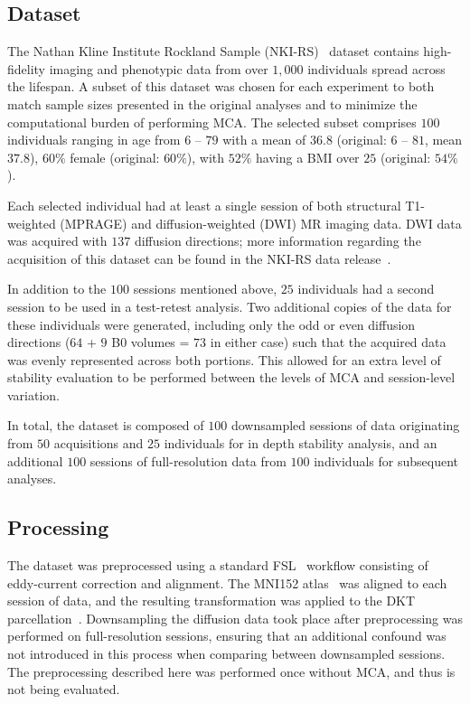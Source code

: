 \documentclass[fleqn,10pt]{SelfArx} %
\newcommand{\new}[1]{{\color{blue} #1}}
\begin{document}
\subsection*{Dataset}
The Nathan Kline Institute Rockland Sample (NKI-RS)~\cite{Nooner2012-eg} dataset contains high-fidelity imaging and
phenotypic data from over $1,000$ individuals spread across the lifespan. A subset of this dataset was chosen for each
experiment to both match sample sizes presented in the original analyses and to minimize the computational burden of
performing MCA. The selected subset comprises $100$ individuals ranging in age from $6$ – $79$ with a mean of $36.8$
(original: $6$ – $81$, mean $37.8$), $60\%$ female (original: $60\%$), with $52\%$ having a BMI over $25$ (original:
$54\%$).

Each selected individual had at least a single session of both structural T1-weighted (MPRAGE) and diffusion-weighted
(DWI) MR imaging data. DWI data was acquired with $137$ diffusion directions; more information regarding the
acquisition of this dataset can be found in the NKI-RS data release~\cite{Nooner2012-eg}.

In addition to the $100$ sessions mentioned above, $25$ individuals had a second session to be used in a test-retest
analysis. Two additional copies of the data for these individuals were generated, including only the odd or even
diffusion directions ($64$ + $9$ B0 volumes = $73$ in either case) \new{such that the acquired data was evenly
represented across both portions}. This allowed for an extra level of stability evaluation to be performed between the
levels of MCA and session-level variation.

In total, the dataset is composed of $100$ downsampled sessions of data originating from $50$ acquisitions
and $25$ individuals for in depth stability analysis, and an additional $100$ sessions of full-resolution data from
$100$ individuals for subsequent analyses.


\subsection*{Processing}
The dataset was preprocessed using a standard FSL~\cite{Jenkinson2012-ly} workflow consisting of eddy-current
correction and alignment. The MNI152 atlas~\cite{lancaster2007bias} was aligned to each session of data, and the
resulting transformation was applied to the DKT parcellation~\cite{Klein2012-vi}. Downsampling the diffusion data took
place after preprocessing was performed on full-resolution sessions, ensuring that an additional confound was not
introduced in this process when comparing between downsampled sessions. The preprocessing described here was performed
once without MCA, and thus is not being evaluated.
\end{document}
